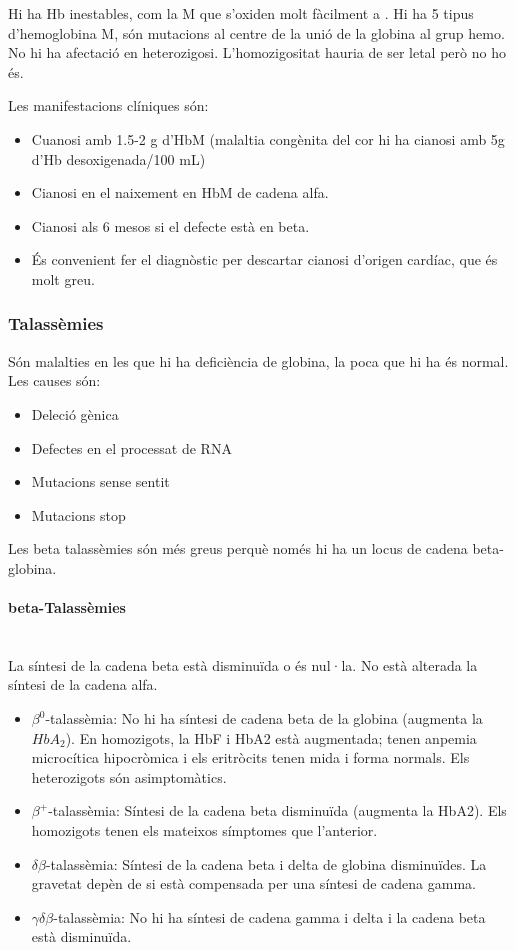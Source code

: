 Hi ha Hb inestables, com la M que s'oxiden molt fàcilment a
. Hi ha 5 tipus d'hemoglobina M, són mutacions al centre de
la unió de la globina al grup hemo. No hi ha afectació en
heterozigosi. L'homozigositat hauria de ser letal però no ho és.

Les manifestacions clíniques són:
\begin{itemize}
\item Cuanosi amb 1.5-2 g d'HbM (malaltia congènita del cor hi ha
  cianosi amb 5g d'Hb desoxigenada/100 mL)
\item Cianosi en el naixement en HbM de cadena alfa.
\item Cianosi als 6 mesos si el defecte està en beta.
\item És convenient fer el diagnòstic per descartar cianosi d'origen
  cardíac, que és molt greu.
\end{itemize}

\subsubsection{Talassèmies}
Són malalties en les que hi ha deficiència de globina, la poca que hi
ha és normal. Les causes són:
\begin{itemize}
\item Deleció gènica
\item Defectes en el processat de RNA
\item Mutacions sense sentit
\item Mutacions stop
\end{itemize}

Les beta talassèmies són més greus perquè només hi ha un locus de
cadena beta-globina.

\paragraph{beta-Talassèmies} \hfill \\
La síntesi de la cadena beta està disminuïda o és nul·la. No està
alterada la síntesi de la cadena alfa.

\begin{itemize}
\item $\beta^0$-talassèmia: No hi ha síntesi de cadena beta de la globina
  (augmenta la $HbA_2$). En homozigots, la HbF i HbA2 està augmentada;
  tenen anpemia microcítica hipocròmica i els eritròcits tenen mida i
  forma normals. Els heterozigots són asimptomàtics.

\item $\beta^+$-talassèmia: Síntesi de la cadena beta disminuïda
  (augmenta la HbA2). Els homozigots tenen els mateixos símptomes que
  l'anterior.

\item $\delta\beta$-talassèmia: Síntesi de la cadena beta i delta de
  globina disminuïdes. La gravetat depèn de si està compensada per una
  síntesi de cadena gamma.

\item $\gamma\delta\beta$-talassèmia: No hi ha síntesi de cadena gamma i
  delta i la cadena beta està disminuïda.
\end{itemize}

